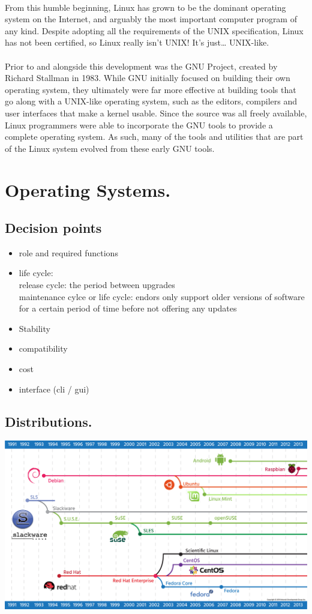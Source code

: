 \documentclass[10pt]{article}
\begin{document}
\paragraph{}
From this humble beginning, Linux has grown to be the dominant operating system on the Internet, and arguably the most important
computer program of any kind. Despite adopting all the requirements of the UNIX specification, Linux has not been certified,
so Linux really isn’t UNIX! It’s just… UNIX-like.
\paragraph{}
Prior to and alongside this development was the GNU Project, created by Richard Stallman in 1983. While GNU initially focused on
building their own operating system, they ultimately were far more effective at building tools that go along with a UNIX-like
operating system, such as the editors, compilers and user interfaces that make a kernel usable. Since the source was all freely
available, Linux programmers were able to incorporate the GNU tools to provide a complete operating system. As such, many of the
tools and utilities that are part of the Linux system evolved from these early GNU tools.
\section{Operating Systems.}
\subsection{Decision points}
\begin{itemize}
	\item role and required functions
	\item life cycle:\\
		release cycle: the period between upgrades\\
		maintenance cylce or life cycle: endors only support older versions of software for a certain period of time before not offering any updates
	\item
		Stability
	\item
		compatibility
	\item
		cost
	\item
		interface (cli / gui)
\end{itemize}
\subsection{Distributions.}
\includegraphics[width=\textwidth]{distros.png}
\end{document}
